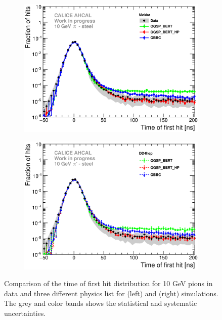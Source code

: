 \begin{figure}[htbp!]
	\begin{subfigure}[t]{0.49\textwidth}
		\centering
		\includegraphics[width=1\textwidth]{../Thesis_Plots/Timing/Pions/Plots/ComparisonToSim/Comparison_SimData_Pion10GeV_LateClusters.eps}
		\caption{}
	\end{subfigure}
	\hfill
	\begin{subfigure}[t]{0.49\textwidth}
		\centering
		\includegraphics[width=1\textwidth]{../Thesis_Plots/Timing/Pions/Plots/ComparisonToSim/Comparison_SimData_Pion10GeV_LateClusters_DD4hep.eps}
		\caption{}
	\end{subfigure}
	\caption{Comparison of the time of first hit distribution for 10 GeV pions in data and three different physics list for \mokka (left) and \ddhep (right) simulations. The grey and color bands shows the statistical and systematic uncertainties.} 	\label{fig:dNdt_SimData_10GeV}
\end{figure}

